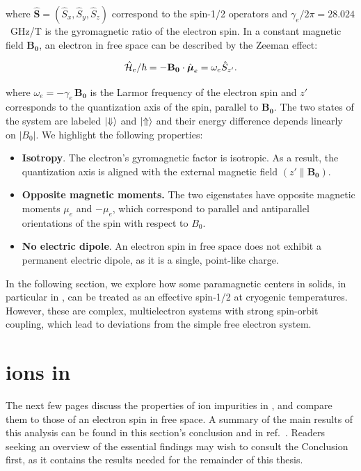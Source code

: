where $\hat{\mathbf{S}}= (\hat{S}_x, \hat{S}_y, \hat{S}_z)$ correspond to the spin-1/2 operators and $\gamma_e / 2\pi = 28.024$~GHz/T is the gyromagnetic ratio of the electron spin. In a constant magnetic field $\mathbf{B_0}$, an electron in free space can be described by the Zeeman effect:

\begin{equation}
    \hat{\mathcal{H}}_{\text{e}} / \hbar = - \mathbf{B_0} \cdot \hat{\boldsymbol{\mu}}_e = \omega_e \hat{S}_{z'}.
\end{equation}

where $\omega_e = -\gamma_e \, \mathbf{B_0}$ is the Larmor frequency of the electron spin and $z'$ corresponds to the quantization axis of the spin, parallel to $\mathbf{B_0}$. The two states of the system are labeled $\ket{\Downarrow}$ and $\ket{\Uparrow}$ and their energy difference depends linearly on $|B_0|$. We highlight the following properties:

\begin{itemize}
    \item \textbf{Isotropy}. The electron's gyromagnetic factor is isotropic. As a result, the quantization axis is aligned with the external magnetic field $(z' \parallel \mathbf{B_0})$.
    \item \textbf{Opposite magnetic moments.} The two eigenstates have opposite magnetic moments $\mu_e$ and $-\mu_e$, which correspond to parallel and antiparallel orientations of the spin with respect to $B_0$.
    \item \textbf{No electric dipole}. An electron spin in free space does not exhibit a permanent electric dipole, as it is a single, point-like charge.
\end{itemize}

In the following section, we explore how some paramagnetic centers in solids, in particular \Er in \Ca, can be treated as an effective spin-1/2 at cryogenic temperatures. However, these are complex, multielectron systems with strong spin-orbit coupling, which lead to deviations from the simple free electron system. 

\section{\Er ions in \Ca}

The next few pages discuss the properties of \Er ion impurities in \Ca, and compare them to those of an electron spin in free space. A summary of the main results of this analysis can be found in this section's conclusion and in ref.~. Readers seeking an overview of the essential findings may wish to consult the Conclusion first, as it contains the results needed for the remainder of this thesis.

